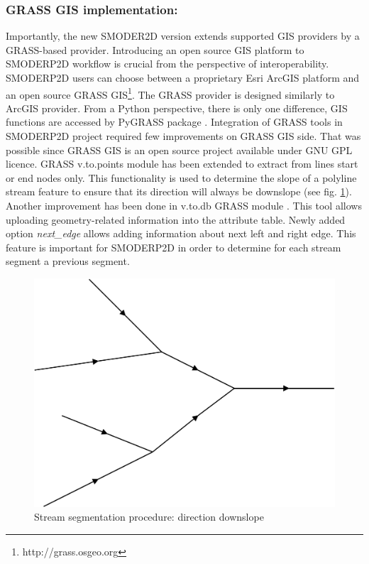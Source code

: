 \subsubsection{GRASS GIS implementation:}\label{sec:grass_provider}
Importantly, the new SMODER2D version extends supported GIS providers
by a GRASS-based provider. Introducing an open source GIS platform to
SMODERP2D workflow is crucial from the perspective of
interoperability. SMODERP2D users can choose between a proprietary
Esri ArcGIS platform and an open source GRASS
GIS\footnote{http://grass.osgeo.org}. The GRASS provider is designed
similarly to ArcGIS provider. From a Python perspective, there is only
one difference, GIS functions are accessed by PyGRASS package
\cite{ijgi2010201}. Integration of GRASS tools in SMODERP2D project
required few improvements on GRASS GIS side. That was possible since
GRASS GIS is an open source project available under GNU GPL
licence. GRASS v.to.points module \cite{v-to-points-2019} has been
extended to extract from lines start or end nodes only. This
functionality is used to determine the slope of a polyline stream
feature to ensure that its direction will always be downslope (see
fig. \ref{fig:stream_next_edge}). Another improvement has been done in
v.to.db GRASS module \cite{v-to-db-2019}. This tool allows uploading
geometry-related information into the attribute table. Newly added
option {\it next\_edge} allows adding information about next left and
right edge. This feature is important for SMODERP2D in order to
determine for each stream segment a previous segment.

\begin{figure}[ht!]
  \begin{center}
    \includegraphics[width=0.6\columnwidth]{figures/stream_next_edge}
    \caption{Stream segmentation procedure: direction downslope}
    \label{fig:stream_next_edge}
  \end{center}
\end{figure}

